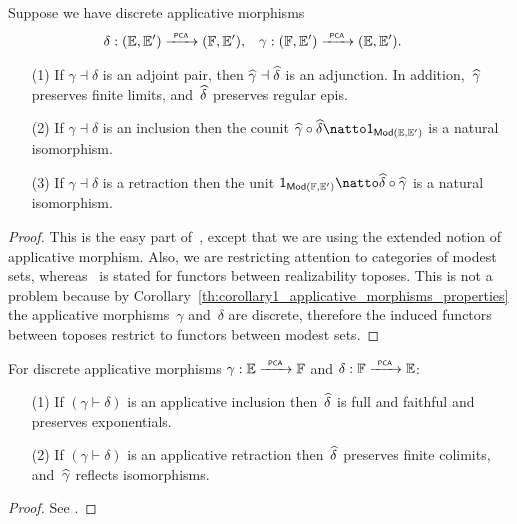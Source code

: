 \begin{theorem}
  \label{th:applicative_adjunction_functor_adjunction}%
  Suppose we have discrete applicative morphisms
  \begin{align*}
    \delta &: ({\mathbb{E}}, {\mathbb{E}'}) \xrightarrow{\scriptscriptstyle\mathsf{\ PCA\ }}{} ({\mathbb{F}}, {\mathbb{E}'}),
    &
    \gamma &: ({\mathbb{F}}, {\mathbb{E}'}) \xrightarrow{\scriptscriptstyle\mathsf{\ PCA\ }}{} ({\mathbb{E}}, {\mathbb{E}'}).
  \end{align*}
  \begin{enumerate}
  \item[(1)] If $\gamma \dashv \delta$ is an adjoint pair, then
    $\widehat{\gamma} \dashv \widehat{\delta}$ is an adjunction.
    In
    addition,~$\widehat{\gamma}$ preserves finite limits, and~$\widehat{\delta}$
    preserves regular epis.
  \item[(2)] If $\gamma \dashv \delta$ is an inclusion then the counit 
    $\ff{\gamma} \circ \ff{\delta} \natto \one_{\Mod{\EE, \subEE}}$ is 
    a natural isomorphism.
  \item[(3)] If $\gamma \dashv \delta$ is a retraction then the unit
    $\one_{\Mod{\FF, \subFF}} \natto \ff{\delta} \circ \ff{\gamma}$ is
    a natural isomorphism.
  \end{enumerate}
\end{theorem}

\begin{proof}
  This is the easy part of~\cite[Proposition 2.5.9]{Longley:94},
  except that we are using the extended notion of applicative
  morphism. Also, we are restricting attention to categories of modest
  sets, whereas~\cite[Proposition 2.5.9]{Longley:94} is stated for
  functors between realizability toposes. This is not a problem
  because by
  Corollary~\ref{th:corollary1_applicative_morphisms_properties} the
  applicative morphisms~$\gamma$ and~$\delta$ are discrete, therefore
  the induced functors between toposes restrict to functors between
  modest sets.
\end{proof}


\begin{proposition}
  \label{th:inclusion_retraction_properties}%
  \textnormal{\cite[Proposition 2.5.11]{Longley:94}} For discrete
  applicative morphisms $\gamma: {\mathbb{E}} \xrightarrow{\scriptscriptstyle\mathsf{\ PCA\ }}{} {\mathbb{F}}$ and $\delta: {\mathbb{F}}
  \xrightarrow{\scriptscriptstyle\mathsf{\ PCA\ }}{} {\mathbb{E}}$:
  \begin{enumerate}
  \item[(1)] If $(\gamma \vdash \delta)$ is an applicative inclusion
    then~$\widehat{\delta}$ is full and faithful and preserves
    exponentials.
  \item[(2)] If $(\gamma \vdash \delta)$ is an applicative retraction
    then~$\widehat{\delta}$ preserves finite colimits, and~$\widehat{\gamma}$
    reflects isomorphisms.
  \end{enumerate}
\end{proposition}

\begin{proof}
  See \cite[Proposition 2.5.11]{Longley:94}.
\end{proof}



